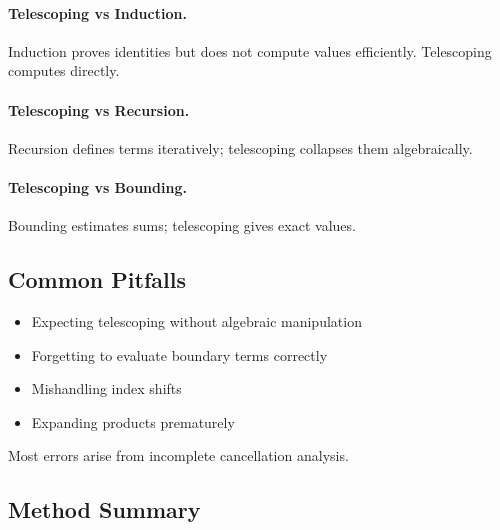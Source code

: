 \documentclass[12pt]{extarticle}
\begin{document}
\paragraph{Telescoping vs Induction.}
Induction proves identities but does not compute values efficiently. Telescoping computes directly.

\paragraph{Telescoping vs Recursion.}
Recursion defines terms iteratively; telescoping collapses them algebraically.

\paragraph{Telescoping vs Bounding.}
Bounding estimates sums; telescoping gives exact values.

\subsection*{Common Pitfalls}

\begin{itemize}
    \item Expecting telescoping without algebraic manipulation
    \item Forgetting to evaluate boundary terms correctly
    \item Mishandling index shifts
    \item Expanding products prematurely
\end{itemize}

Most errors arise from incomplete cancellation analysis.

\subsection*{Method Summary}

\begin{center}
\end{center}
\end{document}
